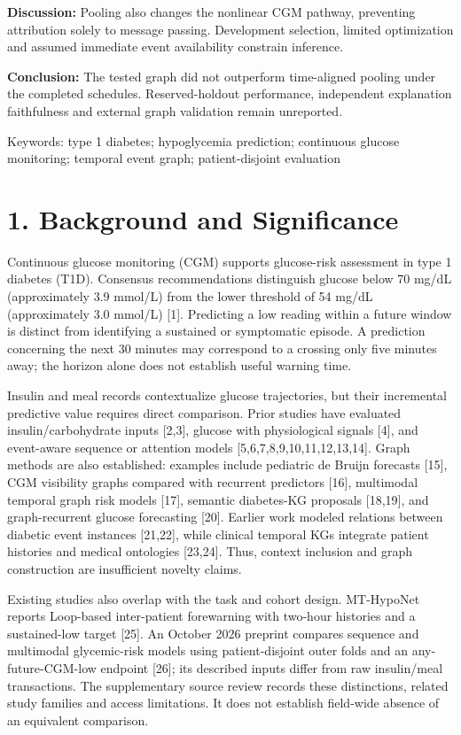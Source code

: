 \documentclass[11pt,a4paper]{article}
\begin{document}
\textbf{Discussion:} Pooling also changes the nonlinear CGM pathway, preventing attribution solely to message passing. Development selection, limited optimization and assumed immediate event availability constrain inference.

\textbf{Conclusion:} The tested graph did not outperform time-aligned pooling under the completed schedules. Reserved-holdout performance, independent explanation faithfulness and external graph validation remain unreported.

Keywords: type 1 diabetes; hypoglycemia prediction; continuous glucose monitoring; temporal event graph; patient-disjoint evaluation

\clearpage
\section*{1. Background and Significance}
Continuous glucose monitoring (CGM) supports glucose-risk assessment in type 1 diabetes (T1D). Consensus recommendations distinguish glucose below 70 mg/dL (approximately 3.9 mmol/L) from the lower threshold of 54 mg/dL (approximately 3.0 mmol/L) [1]. Predicting a low reading within a future window is distinct from identifying a sustained or symptomatic episode. A prediction concerning the next 30 minutes may correspond to a crossing only five minutes away; the horizon alone does not establish useful warning time.

Insulin and meal records contextualize glucose trajectories, but their incremental predictive value requires direct comparison. Prior studies have evaluated insulin/carbohydrate inputs [2,3], glucose with physiological signals [4], and event-aware sequence or attention models [5,6,7,8,9,10,11,12,13,14]. Graph methods are also established: examples include pediatric de Bruijn forecasts [15], CGM visibility graphs compared with recurrent predictors [16], multimodal temporal graph risk models [17], semantic diabetes-KG proposals [18,19], and graph-recurrent glucose forecasting [20]. Earlier work modeled relations between diabetic event instances [21,22], while clinical temporal KGs integrate patient histories and medical ontologies [23,24]. Thus, context inclusion and graph construction are insufficient novelty claims.

Existing studies also overlap with the task and cohort design. MT-HypoNet reports Loop-based inter-patient forewarning with two-hour histories and a sustained-low target [25]. An October 2026 preprint compares sequence and multimodal glycemic-risk models using patient-disjoint outer folds and an any-future-CGM-low endpoint [26]; its described inputs differ from raw insulin/meal transactions. The supplementary source review records these distinctions, related study families and access limitations. It does not establish field-wide absence of an equivalent comparison.
\end{document}

